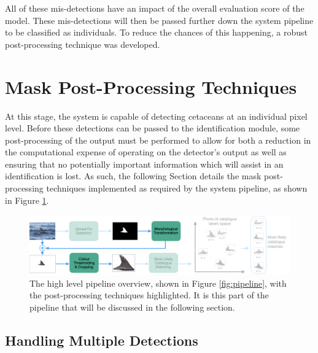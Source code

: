 All of these mis-detections have an impact of the overall evaluation score of the model. These mis-detections will then be passed further down the system pipeline to be classified as individuals. To reduce the chances of this happening, a robust post-processing technique was developed.

\section{Mask Post-Processing Techniques}\label{ch:cetDet,sec:postProcessing}

At this stage, the system is capable of detecting cetaceans at an individual pixel level. Before these detections can be passed to the identification module, some post-processing of the output must be performed to allow for both a reduction in the computational expense of operating on the detector's output as well as ensuring that no potentially important information which will assist in an identification is lost. As such, the following Section details the mask post-processing techniques implemented as required by the system pipeline, as shown in Figure \ref{fig:pipeline-post-processed}.

\begin{figure}[!h]
	\begin{center}
		\includegraphics[width=\linewidth]{Chapter3/figs/pipeline-post-processed.png}
	\end{center}
	\caption[The high level pipeline overview, shown in Figure \ref{fig:pipeline}, with the post-processing techniques highlighted.]{The high level pipeline overview, shown in Figure \ref{fig:pipeline}, with the post-processing techniques highlighted. It is this part of the pipeline that will be discussed in the following section.}
	\label{fig:pipeline-post-processed}
\end{figure}

\subsection{Handling Multiple Detections}\label{ch:cetDet,sec:postProcessing,sub:handlingMultipleDetections}

